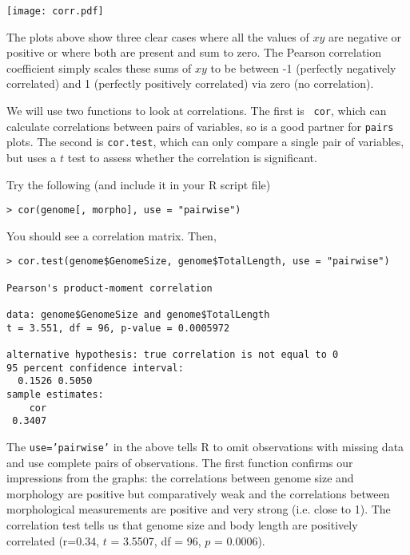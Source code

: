 \begin{center}
	\texttt{[image: corr.pdf]} 
\end{center}

The plots above show three clear cases where all the values of $xy$ are 
negative or positive or where both are present and sum to zero. The 
Pearson correlation coefficient simply scales these sums of $xy$ to be 
between -1 (perfectly negatively correlated) and 1 (perfectly 
positively  correlated) via zero (no correlation).

We will use two functions to look at correlations. The first is {\tt 
cor}, which can calculate correlations between pairs of variables, so 
is a good partner for {\tt pairs} plots. The second is {\tt cor.test}, 
which can only compare a single pair of variables, but uses a $t$ test 
to assess whether the correlation is significant. 

\begin{compactitem}[$\quad\star$]
	\item Try the following (and include it in your R script file)
\end{compactitem}


\begin{lstlisting}
> cor(genome[, morpho], use = "pairwise")
\end{lstlisting}

You should see a correlation matrix. Then,

\begin{lstlisting}
> cor.test(genome$GenomeSize, genome$TotalLength, use = "pairwise")	

Pearson's product-moment correlation

data: genome$GenomeSize and genome$TotalLength
t = 3.551, df = 96, p-value = 0.0005972

alternative hypothesis: true correlation is not equal to 0 
95 percent confidence interval:
  0.1526 0.5050 
sample estimates:
    cor 
 0.3407   
\end{lstlisting}

The {\tt use='pairwise'} in the above tells R to omit observations with 
missing data and use complete pairs of observations. The first function 
confirms our impressions from the graphs: the correlations between 
genome size and morphology are positive but comparatively weak and the 
correlations between morphological measurements are positive and very 
strong (i.e. close to 1). The correlation test tells us that genome 
size and body length are positively correlated (r=0.34, $t$ = 3.5507, 
df = 96, $p$ = 0.0006).

